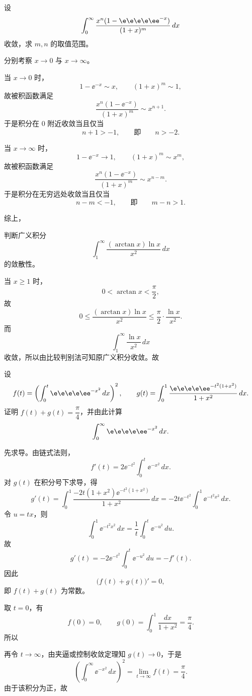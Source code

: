 \begin{question}[反常积分的收敛条件]

设
\[
\int_0^{\infty}\frac{x^n(1-\e\e\e\e\ee^{-x})}{(1+x)^m}\,dx
\]
收敛，求 $m,n$ 的取值范围。

\begin{solution}
分别考察 $x\to0$ 与 $x\to\infty$。

当 $x\to0$ 时，
\[
1-\ee^{-x}\sim x,
\qquad
(1+x)^m\sim 1,
\]
故被积函数满足
\[
\frac{x^n(1-\ee^{-x})}{(1+x)^m}\sim x^{n+1}.
\]
于是积分在 $0$ 附近收敛当且仅当
\[
n+1>-1,
\qquad\text{即}\qquad n>-2.
\]

当 $x\to\infty$ 时，
\[
1-\ee^{-x}\to1,
\qquad
(1+x)^m\sim x^m,
\]
故被积函数满足
\[
\frac{x^n(1-\ee^{-x})}{(1+x)^m}\sim x^{n-m}.
\]
于是积分在无穷远处收敛当且仅当
\[
n-m<-1,
\qquad\text{即}\qquad m-n>1.
\]

综上，
\end{solution}
\end{question}

\begin{question}[广义积分的敛散性]

判断广义积分
\[
\int_1^{\infty}\frac{(\arctan x)\ln x}{x^2}\,dx
\]
的敛散性。

\begin{solution}
当 $x\ge1$ 时，
\[
0<\arctan x<\frac{\pi}{2},
\]
故
\[
0\le \frac{(\arctan x)\ln x}{x^2}
\le \frac{\pi}{2}\cdot \frac{\ln x}{x^2}.
\]
而
\[
\int_1^{\infty}\frac{\ln x}{x^2}\,dx
\]
收敛，所以由比较判别法可知原广义积分收敛。故
\end{solution}
\end{question}

\begin{question}[恒等式证明与高斯积分]

设
\[
f(t)=\left(\int_0^t \e\e\e\e\ee^{-x^2}\,dx\right)^2,
\qquad
g(t)=\int_0^1\frac{\e\e\e\e\ee^{-t^2(1+x^2)}}{1+x^2}\,dx.
\]
证明 $f(t)+g(t)=\dfrac{\pi}{4}$，并由此计算
\[
\int_0^{\infty}\e\e\e\e\ee^{-x^2}\,dx.
\]

\begin{solution}
先求导。由链式法则，
\[
f'(t)=2\ee^{-t^2}\int_0^t \ee^{-x^2}\,dx.
\]
对 $g(t)$ 在积分号下求导，得
\[
g'(t)=\int_0^1\frac{-2t(1+x^2)\ee^{-t^2(1+x^2)}}{1+x^2}\,dx
=-2t \ee^{-t^2}\int_0^1 \ee^{-t^2x^2}\,dx.
\]
令 $u=tx$，则
\[
\int_0^1 \ee^{-t^2x^2}\,dx=\frac1t\int_0^t \ee^{-u^2}\,du.
\]
故
\[
g'(t)=-2\ee^{-t^2}\int_0^t \ee^{-u^2}\,du=-f'(t).
\]
因此
\[
\bigl(f(t)+g(t)\bigr)'=0,
\]
即 $f(t)+g(t)$ 为常数。

取 $t=0$，有
\[
f(0)=0,
\qquad
g(0)=\int_0^1\frac{dx}{1+x^2}=\frac{\pi}{4}.
\]
所以

再令 $t\to\infty$，由夹逼或控制收敛定理知 $g(t)\to0$，于是
\[
\left(\int_0^{\infty}\ee^{-x^2}\,dx\right)^2=\lim_{t\to\infty}f(t)=\frac{\pi}{4}.
\]
由于该积分为正，故
\end{solution}
\end{question}

